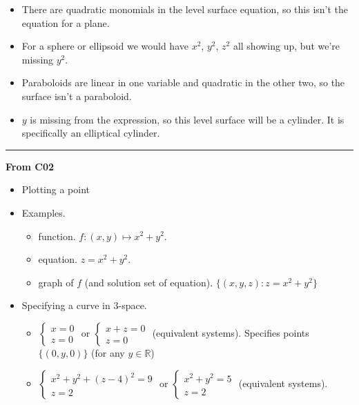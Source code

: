 \documentclass[12pt,letterpaper,noanswers]{exam}
\begin{document}
\begin{itemize}
    \item There are quadratic monomials in the level surface equation, so this isn't the equation for a plane.
    \item For a sphere or ellipsoid we would have $x^2$, $y^2$, $z^2$ all showing up, but we're missing $y^2$.
    \item Paraboloids are linear in one variable and quadratic in the other two, so the surface isn't a paraboloid.
    \item $y$ is missing from the expression, so this level surface will be a cylinder.  It is specifically an elliptical cylinder.
\end{itemize}

\vspace{0.2cm}
\hrule
\vspace{0.2cm}

\noindent\textbf{From C02}
\begin{itemize}
\itemsep0em
    \item Plotting a point
    \item Examples.
    \begin{itemize}
    \itemsep0em
        \item function.  $f: (x,y) \mapsto x^2+y^2$.
        \item equation.  $z = x^2 + y^2$.
        \item graph of $f$ (and solution set of equation).  $\{(x,y,z): z = x^2+y^2\}$
    \end{itemize}
    \item Specifying a curve in $3$-space.
    \begin{itemize}
    \itemsep0em
        \item $\left\{\begin{array}{c}x= 0 \\ z = 0\end{array}\right.$ or  $\left\{\begin{array}{c}x + z = 0 \\ z = 0\end{array}\right.$ (equivalent systems).  Specifies points $\{(0,y,0)\}$ (for any $y\in \mathbb{R}$)
        \item $\left\{\begin{array}{c}x^2+y^2 + (z-4)^2= 9 \\ z = 2\end{array}\right.$ or  $\left\{\begin{array}{c}x^2 + y^2 = 5 \\ z = 2\end{array}\right.$ (equivalent systems).
    \end{itemize}
\end{itemize}
\end{document}
